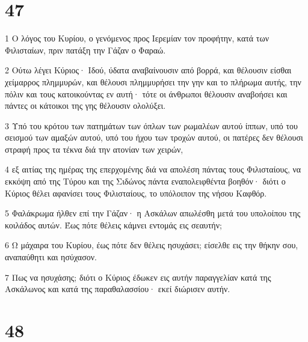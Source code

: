 \chapter{47}

\par 1 Ο λόγος του Κυρίου, ο γενόμενος προς Ιερεμίαν τον προφήτην, κατά των Φιλισταίων, πριν πατάξη την Γάζαν ο Φαραώ.
\par 2 Ούτω λέγει Κύριος· Ιδού, ύδατα αναβαίνουσιν από βορρά, και θέλουσιν είσθαι χείμαρρος πλημμυρών, και θέλουσι πλημμυρήσει την γην και το πλήρωμα αυτής, την πόλιν και τους κατοικούντας εν αυτή· τότε οι άνθρωποι θέλουσιν αναβοήσει και πάντες οι κάτοικοι της γης θέλουσιν ολολύξει.
\par 3 Υπό του κρότου των πατημάτων των όπλων των ρωμαλέων αυτού ίππων, υπό του σεισμού των αμαξών αυτού, υπό του ήχου των τροχών αυτού, οι πατέρες δεν θέλουσι στραφή προς τα τέκνα διά την ατονίαν των χειρών,
\par 4 εξ αιτίας της ημέρας της επερχομένης διά να απολέση πάντας τους Φιλισταίους, να εκκόψη από της Τύρου και της Σιδώνος πάντα εναπολειφθέντα βοηθόν· διότι ο Κύριος θέλει αφανίσει τους Φιλισταίους, το υπόλοιπον της νήσου Καφθόρ.
\par 5 Φαλάκρωμα ήλθεν επί την Γάζαν· η Ασκάλων απωλέσθη μετά του υπολοίπου της κοιλάδος αυτών. Έως πότε θέλεις κάμνει εντομάς εις σεαυτήν;
\par 6 Ω μάχαιρα του Κυρίου, έως πότε δεν θέλεις ησυχάσει; είσελθε εις την θήκην σου, αναπαύθητι και ησύχασον.
\par 7 Πως να ησυχάσης; διότι ο Κύριος έδωκεν εις αυτήν παραγγελίαν κατά της Ασκάλωνος και κατά της παραθαλασσίου· εκεί διώρισεν αυτήν.

\chapter{48}

